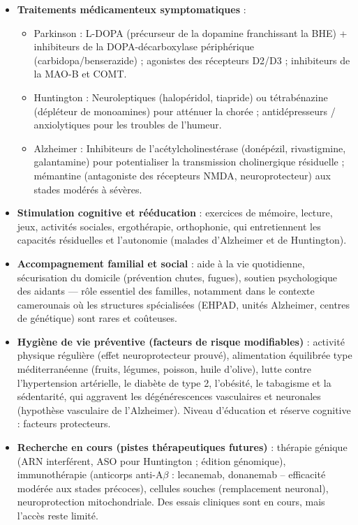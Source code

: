 \documentclass[11pt]{article}
\newcommand{\cle}[1]{{\popxbold\color{popdark}#1}}
\begin{document}
\begin{itemize}
\item \textbf{Traitements médicamenteux symptomatiques} :
  \begin{itemize}
  \item Parkinson : L-DOPA (précurseur de la dopamine franchissant la BHE) + inhibiteurs de la DOPA-décarboxylase périphérique (carbidopa/benserazide) ; agonistes des récepteurs D2/D3 ; inhibiteurs de la MAO-B et COMT.
  \item Huntington : Neuroleptiques (halopéridol, tiapride) ou tétrabénazine (dépléteur de monoamines) pour atténuer la chorée ; antidépresseurs / anxiolytiques pour les troubles de l'humeur.
  \item Alzheimer : Inhibiteurs de l'acétylcholinestérase (donépézil, rivastigmine, galantamine) pour potentialiser la transmission cholinergique résiduelle ; mémantine (antagoniste des récepteurs NMDA, neuroprotecteur) aux stades modérés à sévères.
  \end{itemize}
\item \textbf{Stimulation cognitive et rééducation} : exercices de mémoire, lecture, jeux, activités sociales, ergothérapie, orthophonie, qui entretiennent les capacités résiduelles et l'autonomie (malades d'Alzheimer et de Huntington).
\item \textbf{Accompagnement familial et social} : aide à la vie quotidienne, sécurisation du domicile (prévention chutes, fugues), soutien psychologique des aidants — rôle essentiel des familles, notamment dans le contexte camerounais où les structures spécialisées (EHPAD, unités Alzheimer, centres de génétique) sont rares et coûteuses.
\item \textbf{Hygiène de vie préventive (facteurs de risque modifiables)} : activité physique régulière (effet neuroprotecteur prouvé), alimentation équilibrée type méditerranéenne (fruits, légumes, poisson, huile d'olive), lutte contre l'\cle{hypertension artérielle}, le \cle{diabète de type 2}, l'obésité, le tabagisme et la sédentarité, qui aggravent les dégénérescences vasculaires et neuronales (hypothèse vasculaire de l'Alzheimer). Niveau d'éducation et réserve cognitive : facteurs protecteurs.
\item \textbf{Recherche en cours (pistes thérapeutiques futures)} : thérapie génique (ARN interférent, ASO pour Huntington ; édition génomique), immunothérapie (anticorps anti-A$\beta$ : lecanemab, donanemab -- efficacité modérée aux stades précoces), cellules souches (remplacement neuronal), neuroprotection mitochondriale. Des essais cliniques sont en cours, mais l'accès reste limité.
\end{itemize}
\end{document}
